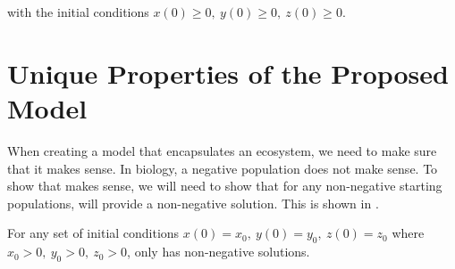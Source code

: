with the initial conditions $x(0) \geq 0,\ y(0) \geq 0,\ z(0) \geq 0$.

\section{Unique Properties of the Proposed Model}\label{sec:unique-properties-of-the-proposed-model}
When creating a model that encapsulates an ecosystem, we need to make sure that it makes sense. In biology, a negative population does not make sense. To show that  makes sense, we will need to show that for any non-negative starting populations,  will provide a non-negative solution. This is shown in .

\begin{theorem}\label{thm:positiveness}
    For any set of initial conditions $x(0) = x_0,\ y(0) = y_0,\ z(0) = z_0$ where $x_0 > 0,\ y_0 > 0,\ z_0 > 0$,  only has non-negative solutions.
\end{theorem}
